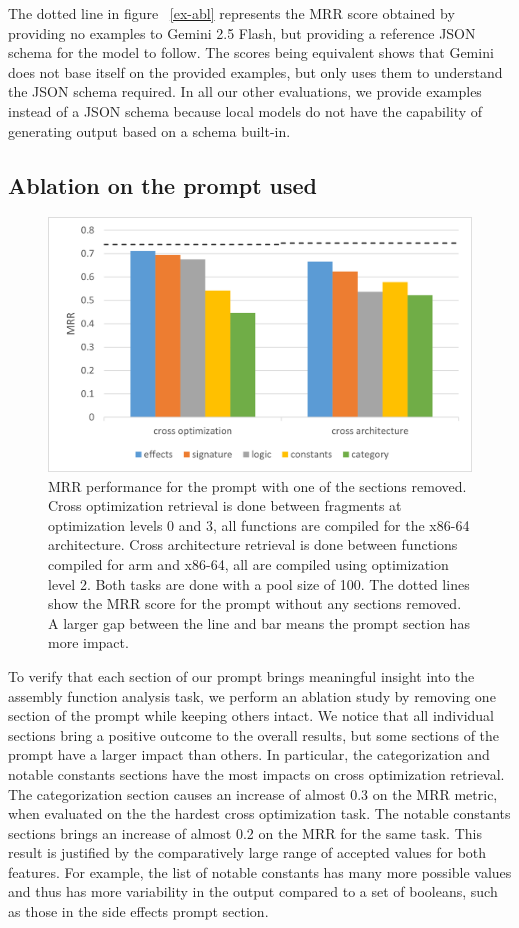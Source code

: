 \documentclass[conference,compsoc]{IEEEtran}
\begin{document}
The dotted line in figure ~\ref{ex-abl} represents the MRR score obtained by providing no examples to Gemini 2.5 Flash, but providing a reference JSON
schema for the model to follow. The scores being equivalent shows that Gemini does not base itself on the provided examples, but only
uses them to understand the JSON schema required. In all our other evaluations, we provide examples instead of a JSON schema because local
models do not have the capability of generating output based on a schema built-in.

\subsection{Ablation on the prompt used}

\begin{figure}[htbp]
\centerline{\includegraphics[width=\linewidth]{prompt-ablation}}
\caption{
MRR performance for the prompt with one of the sections removed. Cross optimization retrieval is done between fragments at
optimization levels 0 and 3, all functions are compiled for the x86-64 architecture. Cross architecture retrieval is done between functions
compiled for arm and x86-64, all are compiled using optimization level 2. Both tasks are done with a pool size of 100. The dotted lines
show the MRR score for the prompt without any sections removed. A larger gap between the line and bar means the prompt section has more impact.}
\label{prompt-abl}
\end{figure}

To verify that each section of our prompt brings meaningful insight into the assembly function analysis task, we perform an ablation
study by removing one section of the prompt while keeping others intact. We notice that all individual sections bring a positive
outcome to the overall results, but some sections of the prompt have a larger impact than others. In particular, the categorization and
notable constants sections have the most impacts on cross optimization retrieval. The categorization section causes an increase of almost
0.3 on the MRR metric, when evaluated on the the hardest cross optimization task. The notable constants sections brings an increase of
almost 0.2 on the MRR for the same task. This result is justified by the comparatively large range of accepted values for both features.
For example, the list of notable constants has many more possible values and thus has more variability in the output compared to a set
of booleans, such as those in the side effects prompt section.
\end{document}
